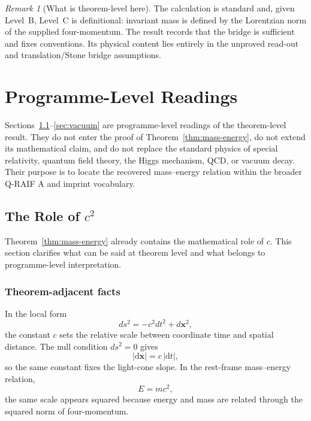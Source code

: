 \documentclass[12pt,a4paper]{article}
\theoremstyle{definition}
\theoremstyle{remark}
\newtheorem{remark}[theorem]{Remark}
\begin{document}
\begin{remark}[What is theorem-level here]
The calculation is standard and, given Level~B, Level~C is definitional: invariant mass is defined by the Lorentzian norm of the supplied four-momentum.  The result records that the bridge is sufficient and fixes conventions.  Its physical content lies entirely in the unproved read-out and translation/Stone bridge assumptions.
\end{remark}

\section{Programme-Level Readings}
\label{sec:programme-readings}

Sections~\ref{sec:c2}--\ref{sec:vacuum} are programme-level readings of the theorem-level result. They do not enter the proof of Theorem~\ref{thm:mass-energy}, do not extend its mathematical claim, and do not replace the standard physics of special relativity, quantum field theory, the Higgs mechanism, QCD, or vacuum decay. Their purpose is to locate the recovered mass--energy relation within the broader Q-RAIF A and imprint vocabulary.

\subsection{The Role of \texorpdfstring{$c^2$}{c2}}
\label{sec:c2}

Theorem~\ref{thm:mass-energy} already contains the mathematical role of $c$. This section clarifies what can be said at theorem level and what belongs to programme-level interpretation.

\subsubsection{Theorem-adjacent facts}

In the local form
\begin{equation}
ds^2=-c^2dt^2+d\mathbf{x}^2,
\end{equation}
the constant $c$ sets the relative scale between coordinate time and spatial distance. The null condition $ds^2=0$ gives
\begin{equation}
|\mathrm d\mathbf{x}|=c\,|\mathrm dt|,
\end{equation}
so the same constant fixes the light-cone slope. In the rest-frame mass--energy relation,
\begin{equation}
E=mc^2,
\end{equation}
the same scale appears squared because energy and mass are related through the squared norm of four-momentum.
\end{document}
